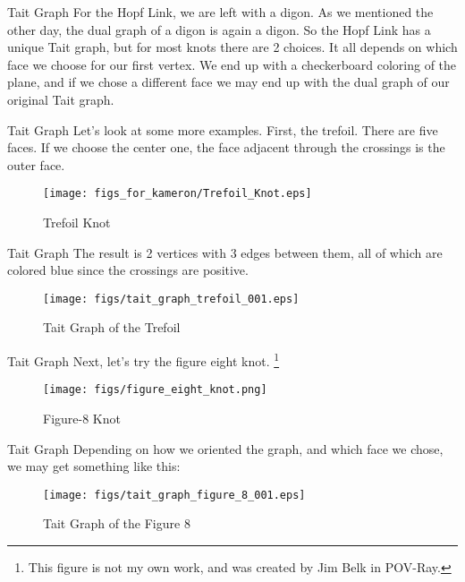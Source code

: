 \documentclass{beamer}
\begin{document}
    \begin{frame}{Tait Graph}
        For the Hopf Link, we are left with a digon. As we mentioned the other
        day, the dual graph of a digon is again a digon. So the Hopf Link has a unique
        Tait graph, but for most knots there are 2 choices. It all depends on which face
        we choose for our first vertex. We end up with a checkerboard coloring of the plane,
        and if we chose a different face we may end up with the dual graph of our original Tait graph.
    \end{frame}
    \begin{frame}{Tait Graph}
        Let's look at some more examples. First, the trefoil. There are five faces.
        If we choose the center one, the face adjacent through the crossings is the
        outer face.
        \begin{figure}
            \centering
            \texttt{[image: figs\_for\_kameron/Trefoil\_Knot.eps]}
            \caption{Trefoil Knot}
            \label{fig:trefoil_knot_diagramb}
        \end{figure}
    \end{frame}
    \begin{frame}{Tait Graph}
        The result is 2 vertices with 3 edges between them, all of which are colored blue
        since the crossings are positive.
        \begin{figure}
            \centering
            \texttt{[image: figs/tait\_graph\_trefoil\_001.eps]}
            \caption{Tait Graph of the Trefoil}
            \label{fig:tait_graph_trefoil_001}
        \end{figure}
    \end{frame}
    \begin{frame}{Tait Graph}
        Next, let's try the figure eight knot.%
        \footnote{This figure is not my own work, and was created by Jim Belk in POV-Ray.}
        \begin{figure}
            \centering
            \texttt{[image: figs/figure\_eight\_knot.png]}
            \caption{Figure-8 Knot}
            \label{fig:figure_eight_knot}
        \end{figure}
    \end{frame}
    \begin{frame}{Tait Graph}
        Depending on how we oriented the graph, and which face we chose,
        we may get something like this:
        \begin{figure}
            \centering
            \texttt{[image: figs/tait\_graph\_figure\_8\_001.eps]}
            \caption{Tait Graph of the Figure 8}
            \label{fig:tait_graph_figure_8_001}
        \end{figure}
    \end{frame}
\end{document}
